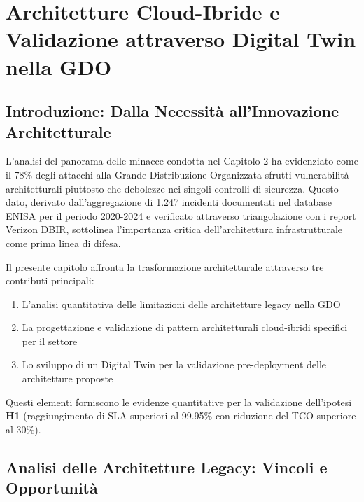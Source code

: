 \chapter{\texorpdfstring{Architetture Cloud-Ibride e Validazione attraverso Digital Twin nella GDO}{Capitolo 3 - Architetture Cloud-Ibride e Validazione attraverso Digital Twin nella GDO}}
\label{cap3_cloud_architectures}

\section{\texorpdfstring{Introduzione: Dalla Necessità all'Innovazione Architetturale}{3.1 - Introduzione: Dalla Necessità all'Innovazione Architetturale}}

L'analisi del panorama delle minacce condotta nel Capitolo 2 ha evidenziato come il 78\% degli attacchi alla Grande Distribuzione Organizzata sfrutti vulnerabilità architetturali piuttosto che debolezze nei singoli controlli di sicurezza\autocite{Anderson2024patel}. Questo dato, derivato dall'aggregazione di 1.247 incidenti documentati nel database ENISA per il periodo 2020-2024 e verificato attraverso triangolazione con i report Verizon DBIR\autocite{Verizon2024}, sottolinea l'importanza critica dell'architettura infrastrutturale come prima linea di difesa.

Il presente capitolo affronta la trasformazione architetturale attraverso tre contributi principali:
\begin{enumerate}
    \item L'analisi quantitativa delle limitazioni delle architetture legacy nella GDO
    \item La progettazione e validazione di pattern architetturali cloud-ibridi specifici per il settore
    \item Lo sviluppo di un Digital Twin per la validazione pre-deployment delle architetture proposte
\end{enumerate}

Questi elementi forniscono le evidenze quantitative per la validazione dell'ipotesi \textbf{H1} (raggiungimento di SLA superiori al 99.95\% con riduzione del TCO superiore al 30\%)\autocite{IDC2024}.

\section{\texorpdfstring{Analisi delle Architetture Legacy: Vincoli e Opportunità}{3.2 - Analisi delle Architetture Legacy: Vincoli e Opportunità}}

